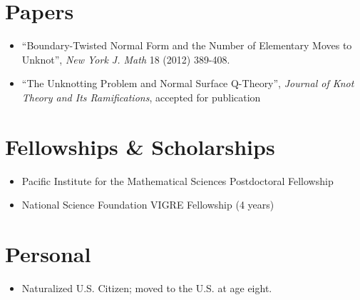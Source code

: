 \documentclass[margin]{res}
\def\tightlist{}
\begin{document}
\begin{resume}
{\section{Papers}\label{papers}}

\begin{itemize}
\tightlist
\item
  ``Boundary-Twisted Normal Form and the Number of Elementary Moves to
  Unknot'', \emph{New York J. Math} 18 (2012) 389-408.
\item
  ``The Unknotting Problem and Normal Surface Q-Theory'', \emph{Journal
  of Knot Theory and Its Ramifications}, accepted for publication
\end{itemize}

\hypertarget{fellowships-scholarships}{%
\section{Fellowships \& Scholarships}\label{fellowships-scholarships}}

\begin{itemize}
\tightlist
\item
  Pacific Institute for the Mathematical Sciences Postdoctoral
  Fellowship
\item
  National Science Foundation VIGRE Fellowship (4 years)
\end{itemize}

\hypertarget{personal}{%
\section{Personal}\label{personal}}

\begin{itemize}
\tightlist
\item
  Naturalized U.S. Citizen; moved to the U.S. at age eight.
\end{itemize}

\end{resume}
\end{document}
